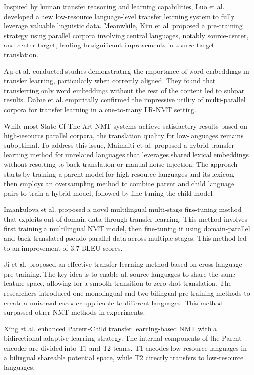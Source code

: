 \documentclass[acmsmall]{acmart}
\begin{document}
Inspired by human transfer reasoning and learning capabilities, Luo et al. \cite{n4-58} developed a new low-resource language-level transfer learning system to fully leverage valuable linguistic data. Meanwhile, Kim et al. \cite{n4-59} proposed a pre-training strategy using parallel corpora involving central languages, notably source-center, and center-target, leading to significant improvements in source-target translation.

Aji et al. \cite{n4-60} conducted studies demonstrating the importance of word embeddings in transfer learning, particularly when correctly aligned. They found that transferring only word embeddings without the rest of the content led to subpar results. Dabre et al. \cite{n4-61} empirically confirmed the impressive utility of multi-parallel corpora for transfer learning in a one-to-many LR-NMT setting.

While most State-Of-The-Art NMT systems achieve satisfactory results based on high-resource parallel corpora, the translation quality for low-languages remains suboptimal. To address this issue, Maimaiti et al. \cite{n4-62} proposed a hybrid transfer learning method for unrelated languages that leverages shared lexical embeddings without resorting to back translation or manual noise injection. The approach starts by training a parent model for high-resource languages and its lexicon, then employs an oversampling method to combine parent and child language pairs to train a hybrid model, followed by fine-tuning the child model. 

Imankulova et al. \cite{n4-63} proposed a novel multilingual multi-stage fine-tuning method that exploits out-of-domain data through transfer learning. This method involves first training a multilingual NMT model, then fine-tuning it using domain-parallel and back-translated pseudo-parallel data across multiple stages. This method led to an improvement of 3.7 BLEU scores.

Ji et al. \cite{JiZDZCL20} proposed an effective transfer learning method based on cross-language pre-training. The key idea is to enable all source languages to share the same feature space, allowing for a smooth transition to zero-shot translation. The researchers introduced one monolingual and two bilingual pre-training methods to create a universal encoder applicable to different languages. This method surpassed other NMT methods in experiments.

Xing et al. \cite{n4-65} enhanced Parent-Child transfer learning-based NMT with a bidirectional adaptive learning strategy. The internal components of the Parent encoder are divided into T1 and T2 teams. T1 encodes low-resource languages in a bilingual shareable potential space, while T2 directly transfers to low-resource languages.
\end{document}
